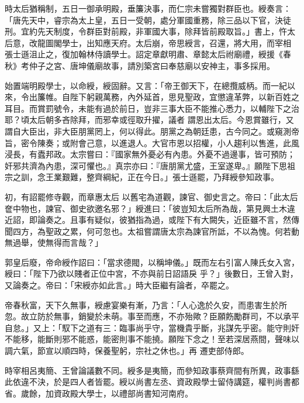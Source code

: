 \begin{pinyinscope}
 時太后猶稱制，五日一御承明殿，垂簾決事，而仁宗未嘗獨對群臣也。綬奏言：「唐先天中，睿宗為太上皇，五日一受朝，處分軍國重務，除三品以下官，決徒刑。宜約先天制度，令群臣對前殿，非軍國大事，除拜皆前殿取旨。」書上，忤太后意，改龍圖閣學士，出知應天府。太后崩，帝思綬言，召還，將大用，而宰相
 張士遜沮止之，復加翰林侍讀學士。詔定章獻明肅、章懿太后祔廟禮，綬援《春秋》考仲子之宮、唐坤儀廟故事，請別築宮曰奉慈廟以安神主，事多採用。



 始置端明殿學士，以命綬，綬固辭。又言：「帝王御天下，在總攬威柄。而一紀以來，令出簾帷。自陛下躬親萬務，內外延首，思見聖政，宜懲違革弊，以新百姓之耳目。而賞罰號令，未能有過於前日，豈非三事大臣不能推心悉力，以輔陛下之治耶？頃太后朝多吝除拜，而邪幸或徑取升擢，議者
 謂恩出太后。今恩賞雖行，又謂自大臣出，非大臣朋黨罔上，何以得此。朋黨之為朝廷患，古今同之。或窺測帝旨，密令陳奏；或附會己意，以進退人。大官市恩以招權，小人趨利以售進，此風浸長，有蠹邦政。太宗嘗曰：『國家無外憂必有內患。外憂不過邊事，皆可預防；奸邪共濟為內患，深可懼也。』真宗亦曰：『唐朋黨尤盛，王室遂卑。』願陛下思祖宗之訓，念王業艱難，整齊綱紀，正在今日。」張士遜罷，乃拜綬參知政事。



 初，有詔罷修寺觀，而章惠太后
 以舊宅為道觀，諫官、御史言之。帝曰：「此太后奩中物也，諫官、御史欲邀名邪？」綬進曰：「彼豈知太后所為哉，第見興土木違近詔，即論奏之。且事有疑似，彼猶指為過，或陛下有大闕失，近臣雖不言，然傳聞四方，為聖政之累，何可忽也。太祖嘗謂唐太宗為諫官所詆，不以為愧。何若動無過舉，使無得而言哉？」



 郭皇后廢，帝命綬作詔曰：「當求德閥，以稱坤儀。」既而左右引富人陳氏女入宮，綬曰：「陛下乃欲以賤者正位中宮，不亦與前日詔語戾
 乎？」後數日，王曾入對，又論奏之。帝曰：「宋綬亦如此言。」時大臣繼有論者，卒罷之。



 帝春秋富，天下久無事，綬慮宴樂有漸，乃言：「人心逸於久安，而患害生於所忽。故立防於無事，銷變於未萌。事至而應，不亦殆歟？臣願飭勵群司，不以承平自怠。」又上：「馭下之道有三：臨事尚乎守，當機貴乎斷，兆謀先乎密。能守則奸不能移，能斷則邪不能惑，能密則事不能撓。願陛下念之！至若深居燕間，聲味以調六氣，節宣以順四時，保養聖躬，宗社之休也。」再
 遷吏部侍郎。



 時宰相呂夷簡、王曾論議數不同。綬多是夷簡，而參知政事蔡齊間有所異，政事繇此依違不決，於是四人者皆罷。綬以尚書左丞、資政殿學士留侍講筵，權判尚書都省。歲餘，加資政殿大學士，以禮部尚書知河南府。




\end{pinyinscope}
